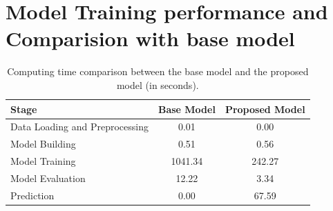 \documentclass[12pt,onecolumn]{report}
\begin{document}
\section{Model Training performance and Comparision with base model}
\begin{table}[h!]
    \centering
    \caption{Computing time comparison between the base model and the proposed model (in seconds).}
    \label{tab:timing-results}
    \begin{tabular}{|l|c|c|}
        \hline
        \textbf{Stage} & \textbf{Base Model} & \textbf{Proposed Model} \\
        \hline
        Data Loading and Preprocessing & 0.01 & 0.00 \\
        Model Building & 0.51 & 0.56 \\
        Model Training & 1041.34 & 242.27 \\
        Model Evaluation & 12.22 & 3.34 \\
        Prediction & 0.00 & 67.59 \\
        \hline
    \end{tabular}
\end{table}
\end{document}
